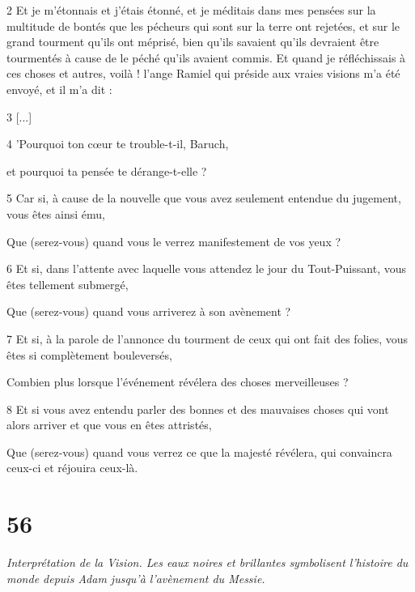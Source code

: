 \par 2 Et je m'étonnais et j'étais étonné, et je méditais dans mes pensées sur la multitude de bontés que les pécheurs qui sont sur la terre ont rejetées, et sur le grand tourment qu'ils ont méprisé, bien qu'ils savaient qu'ils devraient être tourmentés à cause de le péché qu'ils avaient commis. Et quand je réfléchissais à ces choses et autres, voilà ! l'ange Ramiel qui préside aux vraies visions m'a été envoyé, et il m'a dit :

\par 3 [...]

\par 4 'Pourquoi ton cœur te trouble-t-il, Baruch,

\par et pourquoi ta pensée te dérange-t-elle ?

\par 5 Car si, à cause de la nouvelle que vous avez seulement entendue du jugement, vous êtes ainsi ému,

\par Que (serez-vous) quand vous le verrez manifestement de vos yeux ?

\par 6 Et si, dans l'attente avec laquelle vous attendez le jour du Tout-Puissant, vous êtes tellement submergé,

\par Que (serez-vous) quand vous arriverez à son avènement ?

\par 7 Et si, à la parole de l'annonce du tourment de ceux qui ont fait des folies, vous êtes si complètement bouleversés,

\par Combien plus lorsque l'événement révélera des choses merveilleuses ?

\par 8 Et si vous avez entendu parler des bonnes et des mauvaises choses qui vont alors arriver et que vous en êtes attristés,

\par Que (serez-vous) quand vous verrez ce que la majesté révélera, qui convaincra ceux-ci et réjouira ceux-là.

\chapter{56}

\par \textit{Interprétation de la Vision. Les eaux noires et brillantes symbolisent l'histoire du monde depuis Adam jusqu'à l'avènement du Messie.}


